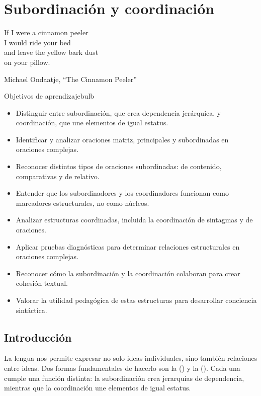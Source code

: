 \chapter{Subordinación y coordinación} \label{ch:subord-coord-es}

\epigraph{If I were a cinnamon peeler\\
I would ride your bed\\
and leave the yellow bark dust\\
on your pillow.}{Michael Ondaatje, \enquote{The Cinnamon Peeler}}

\begin{tblsframedsymbol}{Objetivos de aprendizaje}{bulb}
\begin{itemize}[noitemsep, leftmargin=*]
    \item Distinguir entre subordinación, que crea dependencia jerárquica, y coordinación, que une elementos de igual estatus.
    \item Identificar y analizar oraciones matriz, principales y subordinadas en oraciones complejas.
    \item Reconocer distintos tipos de oraciones subordinadas: de contenido, comparativas y de relativo.
    \item Entender que los subordinadores y los coordinadores funcionan como marcadores estructurales, no como núcleos.
    \item Analizar estructuras coordinadas, incluida la coordinación de sintagmas y de oraciones.
    \item Aplicar pruebas diagnósticas para determinar relaciones estructurales en oraciones complejas.
    \item Reconocer cómo la subordinación y la coordinación colaboran para crear cohesión textual.
    \item Valorar la utilidad pedagógica de estas estructuras para desarrollar conciencia sintáctica.
\end{itemize}
\end{tblsframedsymbol}

\section{Introducción}

La lengua nos permite expresar no solo ideas individuales, sino también relaciones entre ideas. Dos formas fundamentales de hacerlo son la  () y la  (). Cada una cumple una función distinta: la subordinación crea jerarquías de dependencia, mientras que la coordinación une elementos de igual estatus.

